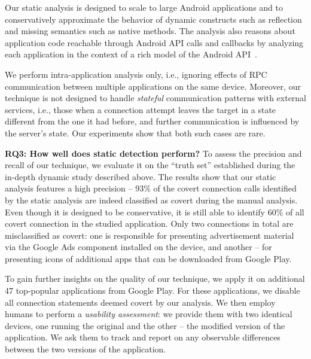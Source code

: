 
Our static analysis is designed to scale to large Android applications
and to conservatively approximate the behavior of dynamic constructs
such as reflection and missing semantics such as native methods.  The
analysis also reasons about application code reachable through Android
API calls and callbacks by analyzing each application in the context
of a rich model of the Android
API~\cite{Gordon:Kim:Perkins:Gilham:Nguyen:Rinard:NDSS15}. 

We perform intra-application analysis only, i.e., ignoring effects of RPC communication between multiple applications on the same device. Moreover, our technique is not designed to handle
\emph{stateful} communication patterns with external services, i.e., those when a connection attempt leaves the target in a state different from the one it had before, and further communication is influenced by the server's state. Our experiments show that both such cases are rare. 

\noindent 
{\bf RQ3: How well does static detection perform?}
To assess the precision and recall of our technique, we evaluate it on the ``truth set'' established during the in-depth dynamic study described above. %
The results show that our static analysis features a high precision -- 93\% of the covert connection calls identified by the static analysis are indeed classified as covert during the manual analysis. Even though it is designed to be conservative, it is still able to identify 60\% of all covert connection in the studied application.
Only two connections in total are misclassified as covert: one is responsible for presenting advertisement material via the Google Ads component installed on the device, and another -- for presenting icons of additional apps that can be downloaded from Google Play. 

To gain further insights on the quality of our technique, we apply it on additional 47 top-popular applications from Google Play. For these applications, we disable all connection statements deemed covert by our analysis. We then employ humans to perform a \emph{usability assessment}: we provide them with two identical devices, one running the original and the other -- the modified version of the application. We ask them to track and report on any observable differences between the two versions of the application. 

